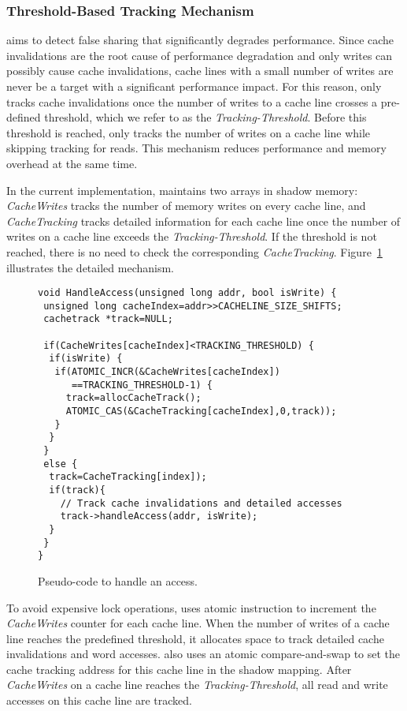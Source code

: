 \subsubsection{Threshold-Based Tracking Mechanism}
\label{sec:thresholdtracking}
\Predator{} aims to detect false sharing that significantly degrades performance. Since cache invalidations are the root cause of performance degradation and only writes 
can possibly cause cache invalidations, 
cache lines with a small number of writes are never be a target with a significant performance impact.
For this reason, \Predator{} only tracks cache invalidations
once the number of writes to a cache line crosses a
pre-defined threshold, which we refer to as the {\it Tracking-Threshold}. 
Before this threshold is reached, \Predator{} only tracks the number of writes on a cache line while skipping tracking for reads.
This mechanism reduces performance and memory overhead
at the same time.

In the current implementation, \Predator{} maintains two arrays in shadow memory: 
{\it CacheWrites} tracks the number of memory writes on every cache line, and
{\it CacheTracking} tracks detailed information 
for each cache line once the number of writes on a cache line exceeds the {\it Tracking-Threshold}. 
If the threshold is not reached, there is no need to check the corresponding {\it CacheTracking}. 
Figure~\ref{fig:algorithm} illustrates the detailed mechanism.

\begin{figure}[!t]
\begin{lstlisting}[style=tt]
void HandleAccess(unsigned long addr, bool isWrite) {
 unsigned long cacheIndex=addr>>CACHELINE_SIZE_SHIFTS;
 cachetrack *track=NULL;

 if(CacheWrites[cacheIndex]<TRACKING_THRESHOLD) {
  if(isWrite) {
   if(ATOMIC_INCR(&CacheWrites[cacheIndex]) 
      ==TRACKING_THRESHOLD-1) {
     track=allocCacheTrack();
     ATOMIC_CAS(&CacheTracking[cacheIndex],0,track));
   }
  } 
 }
 else {
  track=CacheTracking[index]);
  if(track){
    // Track cache invalidations and detailed accesses
    track->handleAccess(addr, isWrite);
  }
 }
}
\end{lstlisting}
\caption{Pseudo-code to handle an access.\label{fig:algorithm}}
\end{figure}

To avoid expensive lock operations, \Predator{} uses atomic instruction to increment the {\it CacheWrites} counter for each cache line. 
When the number of writes of a cache line reaches the predefined threshold,
it allocates space to track detailed cache invalidations and word accesses. \Predator{} also 
uses an atomic compare-and-swap to set the cache tracking address for this cache line in the shadow mapping.
After {\it CacheWrites} on a cache line reaches the {\it Tracking-Threshold}, all read and write accesses on this cache line are tracked.



